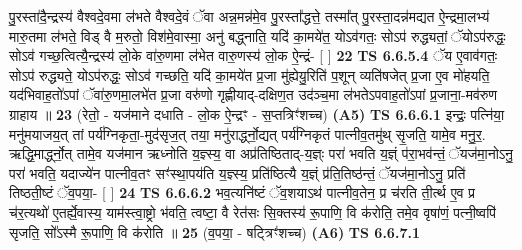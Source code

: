 \documentclass[17pt]{extarticle}
\begin{document}
                  पु॒रस्ता॑दै॒न्द्रस्य॑ वैश्वदे॒वमा ल॑भते वैश्वदे॒वं ॅवा अन्न॒मन्न॑मे॒व पु॒रस्ता᳚द्धत्ते॒ तस्मा᳚त् पु॒रस्ता॒दन्न॑मद्यत ऐ॒न्द्रमा॒लभ्य॑ मारु॒तमा ल॑भते॒ विड् वै म॒रुतो॒ विश॑मे॒वास्मा॒ अनु॑ बद्ध्नाति॒ यदि॑ का॒मये॑त॒ योऽव॑गतः॒ सोऽप॑ रुद्ध्यतां॒ ॅयोऽप॑रुद्धः॒ सोऽव॑ गच्छ॒त्वित्यै॒न्द्रस्य॑ लो॒के वा॑रु॒णमा ल॑भेत वारु॒णस्य॑ लो॒क ऐ॒न्द्रं- [  ] \textbf{  22} \newline
                  \newline
                                \textbf{ TS 6.6.5.4} \newline
                  ॅय ए॒वाव॑गतः॒ सोऽप॑ रुद्ध्यते॒ योऽप॑रुद्धः॒ सोऽव॑ गच्छति॒ यदि॑ का॒मये॑त प्र॒जा मु॑ह्येयु॒रिति॑ प॒शून् व्यति॑षजेत् प्र॒जा ए॒व मो॑हयति॒ यद॑भिवाह॒तो॑ऽपां ॅवा॑रु॒णमा॒लभे॑त प्र॒जा वरु॑णो गृह्णीयाद्-दक्षिण॒त उद॑ञ्च॒मा ल॑भतेऽपवाह॒तो॑ऽपां प्र॒जाना॒-मव॑रुण ग्राहाय ॥ \textbf{  23 } \newline
                  \newline
                      (रेतो॒ - यज॑माने दधाति - लो॒क ऐ॒न्द्रꣳ - स॒प्तत्रिꣳ॑शच्च)  \textbf{(A5)} \newline \newline
                                        \textbf{ TS 6.6.6.1} \newline
                  इन्द्रः॒ पत्नि॑या॒ मनु॑मयाजय॒त् तां पर्य॑ग्निकृता॒-मुद॑सृज॒त् तया॒ मनु॑रार्द्ध्नो॒द्यत् पर्य॑ग्निकृतं पात्नीव॒तमु॑थ् सृ॒जति॒ यामे॒व मनु॒र॒. ऋद्धि॒मार्द्ध्नो॒त् तामे॒व यज॑मान ऋध्नोति य॒ज्ञ्स्य॒ वा अप्र॑तिष्ठिताद्-य॒ज्ञ्ः परा॑ भवति य॒ज्ञ्ं प॑रा॒भव॑न्तं॒ ॅयज॑मा॒नोऽनु॒ परा॑ भवति॒ यदाज्ये॑न पात्नीव॒तꣳ सꣳ॑स्था॒पय॑ति य॒ज्ञ्स्य॒ प्रति॑ष्ठित्यै य॒ज्ञ्ं प्र॑ति॒तिष्ठ॑न्तं॒ ॅयज॑मा॒नोऽनु॒ प्रति॑ तिष्ठती॒ष्टं ॅव॒पया॒- [  ] \textbf{  24} \newline
                  \newline
                                \textbf{ TS 6.6.6.2} \newline
                  भव॒त्यनि॑ष्टं ॅव॒शयाऽथ॑ पात्नीव॒तेन॒ प्र च॑रति ती॒र्त्थ ए॒व प्र च॑र॒त्यथो॑ ए॒तर्ह्ये॒वास्य॒ याम॑स्त्वा॒ष्ट्रो भ॑वति॒ त्वष्टा॒ वै रेत॑सः सि॒क्तस्य॑ रू॒पाणि॒ वि क॑रोति॒ तमे॒व वृषा॑णं॒ पत्नी॒ष्वपि॑ सृजति॒ सो᳚ऽस्मै रू॒पाणि॒ वि क॑रोति ॥ \textbf{  25 } \newline
                  \newline
                      (व॒पया॒ - षट्त्रिꣳ॑शच्च)  \textbf{(A6)} \newline \newline
                                        \textbf{ TS 6.6.7.1} \newline
\end{document}
